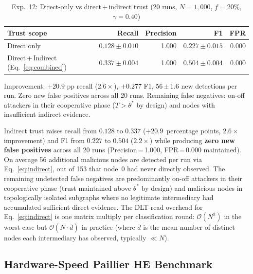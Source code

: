 \documentclass[journal,twoside,10pt]{IEEEtran}
\begin{document}
\begin{table}[t]
\centering
\caption{Exp.~12: Direct-only vs direct\,+\,indirect trust
         (20 runs, $N\!=\!1{,}000$, $f\!=\!20\%$, $\gamma\!=\!0.40$)}
\label{tab:exp12}
\renewcommand{\arraystretch}{1.1}
\small
\begin{tabular}{lrrrr}
\toprule
Trust scope & Recall & Precision & F1 & FPR \\
\midrule
Direct only                 & $0.128 \pm 0.010$ & 1.000 & $0.227 \pm 0.015$ & 0.000 \\
Direct\,+\,Indirect (Eq.~\eqref{eq:combined}) & $0.337 \pm 0.004$ & 1.000 & $0.504 \pm 0.004$ & 0.000 \\
\bottomrule
\end{tabular}
{\footnotesize Improvement: $+20.9$ pp recall ($2.6\times$), $+0.277$ F1, 56\,$\pm$\,1.6 new detections per run.
Zero new false positives across all 20 runs.
Remaining false negatives: on-off attackers in their cooperative phase
($T > \theta^*$ by design) and nodes with insufficient indirect evidence.}
\end{table}

Indirect trust raises recall from $0.128$ to $0.337$
($+20.9$~percentage points, $2.6\times$ improvement)
and F1 from $0.227$ to $0.504$ ($2.2\times$) while
producing \textbf{zero new false positives} across all 20 runs
(Precision\,=\,1.000, FPR\,=\,0.000 maintained).
On average 56 additional malicious nodes are detected per run via
Eq.~\eqref{eq:indirect}, out of 153 that node~0 had never directly
observed.
The remaining undetected false negatives are predominantly on-off
attackers in their cooperative phase (trust maintained above $\theta^*$
by design) and malicious nodes in topologically isolated subgraphs
where no legitimate intermediary had accumulated sufficient direct evidence.
The DLT-read overhead for Eq.~\eqref{eq:indirect} is one matrix
multiply per classification round: $\mathcal{O}(N^2)$ in the worst case
but $\mathcal{O}(N \cdot \bar{d})$ in practice
(where $\bar{d}$ is the mean number of distinct nodes each intermediary
has observed, typically $\ll N$).

\subsection{Hardware-Speed Paillier HE Benchmark}
\label{sec:paillier_hw}
\end{document}
